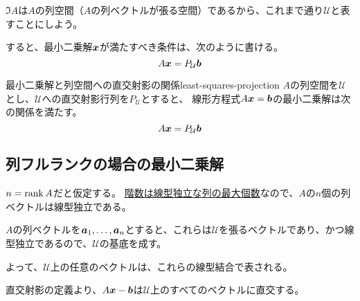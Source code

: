 \documentclass[../../../topic_linear-algebra]{subfiles}
\begin{document}
\br

$\Im A$は$A$の列空間（$A$の列ベクトルが張る空間）であるから、これまで通り$\mathcal{U}$と表すことにしよう。

すると、最小二乗解$\vb*{x}$が満たすべき条件は、次のように書ける。
\begin{equation*}
  A\vb*{x} = P_{\mathcal{U}}\vb*{b}
\end{equation*}

\begin{theorem}{最小二乗解と列空間への直交射影の関係}{least-squares-projection}
  $A$の列空間を$\mathcal{U}$とし、$\mathcal{U}$への直交射影行列を$P_{\mathcal{U}}$とすると、
  線形方程式$A\vb*{x} = \vb*{b}$の最小二乗解は次の関係を満たす。
  \begin{equation*}
    A\vb*{x} = P_{\mathcal{U}}\vb*{b}
  \end{equation*}
\end{theorem}

\subsection{列フルランクの場合の最小二乗解}

$n = \rank A$だと仮定する。
\hyperref[thm:rank-equals-max-indep-cols]{階数は線型独立な列の最大個数}なので、$A$の$n$個の列ベクトルは線型独立である。

\br

$A$の列ベクトルを$\vb*{a}_1, \ldots, \vb*{a}_n$とすると、これらは$\mathcal{U}$を張るベクトルであり、かつ線型独立であるので、$\mathcal{U}$の基底を成す。

よって、$\mathcal{U}$上の任意のベクトルは、これらの線型結合で表される。

\br

直交射影の定義より、$A\vb*{x} - \vb*{b}$は$\mathcal{U}$上のすべてのベクトルに直交する。

\br
\end{document}

